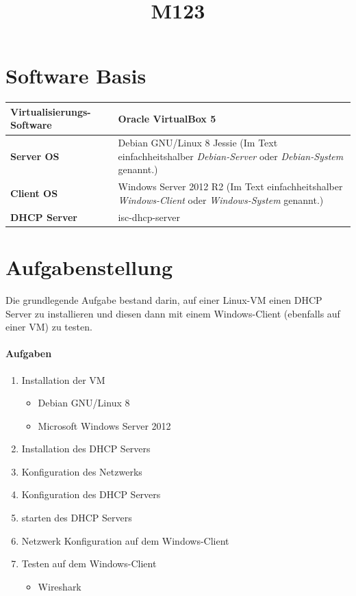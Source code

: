 \documentclass[12pt,a4paper,twoside,titlepage]{article}
\title{\textbf{M123}\\\titleText}
\author{\authorText}
\date{\dateText}
\begin{document}
	\maketitle
	\tableofcontents

        \section{Software Basis}

        \begin{tabular}{|l|p{7cm}|}
          \hline
          \textbf{Virtualisierungs-Software} & Oracle VirtualBox 5\\\hline
          \textbf{Server OS} & Debian GNU/Linux 8 Jessie (Im Text einfachheitshalber \textit{Debian-Server} oder \textit{Debian-System} genannt.)\\\hline
          \textbf{Client OS} & Windows Server 2012 R2 (Im Text einfachheitshalber \textit{Windows-Client} oder \textit{Windows-System} genannt.) \\\hline
          \textbf{DHCP Server} & isc-dhcp-server \\\hline
        \end{tabular}

        \section{Aufgabenstellung}

        Die grundlegende Aufgabe bestand darin, auf einer Linux-VM einen DHCP Server zu installieren und diesen dann mit einem Windows-Client (ebenfalls auf einer VM) zu testen.

        \paragraph{Aufgaben}
        \begin{enumerate}
        \item Installation der VM
          \begin{itemize}
          \item Debian GNU/Linux 8
          \item Microsoft Windows Server 2012
          \end{itemize}
        \item Installation des DHCP Servers
        \item Konfiguration des Netzwerks
        \item Konfiguration des DHCP Servers
        \item starten des DHCP Servers
        \item Netzwerk Konfiguration auf dem Windows-Client
        \item Testen auf dem Windows-Client
          \begin{itemize}
          \item Wireshark
          \end{itemize}
        \end{enumerate}
\end{document}
